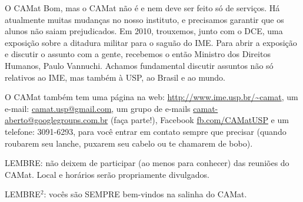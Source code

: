 \begin{secao}{O CAMat}
Bom, mas o CAMat não é e nem deve ser feito só de serviços. Há atualmente
muitas mudanças no nosso instituto, e precisamos garantir que os alunos não
saiam prejudicados. Em 2010, trouxemos, junto com o
DCE, uma exposição sobre a ditadura militar para o saguão do IME. Para abrir a
exposição e discutir o assunto com a gente, recebemos o então Ministro dos
Direitos Humanos, Paulo Vannuchi. Achamos fundamental discutir assuntos não só
relativos ao IME, mas também à USP, ao Brasil e ao mundo.


O CAMat também tem uma página na web: \url{http://www.ime.usp.br/~camat}, um
e-mail: \url{camat.usp@gmail.com}, um grupo de e-mails \url{camat-aberto@googlegroups.com.br} (faça parte!), Facebook \url{fb.com/CAMatUSP} e um telefone: 3091-6293, para você entrar em contato sempre
que precisar (quando roubarem seu lanche, puxarem seu cabelo ou te chamarem de
bobo).

LEMBRE: não deixem de participar (ao menos para conhecer) das reuniões do
CAMat. Local e horários serão propriamente divulgados.

LEMBRE$^2$: vocês são SEMPRE bem-vindos na salinha do CAMat.

\end{secao}
